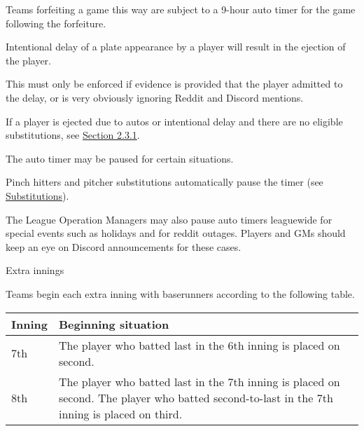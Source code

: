 \begin{deepEnumerate}
\begin{deepEnumerate}
\begin{deepEnumerate}
			\begin{deepEnumerate}
				\item Teams forfeiting a game this way are subject to a 9-hour auto timer for the game following the forfeiture.
			\end{deepEnumerate}
			\item Intentional delay of a plate appearance by a player will result in the ejection of the player.
			\begin{deepEnumerate}
				\item This must only be enforced if evidence is provided that the player admitted to the delay, or is very obviously ignoring Reddit and Discord mentions.
			\end{deepEnumerate}
		\end{deepEnumerate}
		\item If a player is ejected due to autos or intentional delay and there are no eligible substitutions, see \hyperref[sec:lineups]{Section 2.3.1}.
		\item The auto timer may be paused for certain situations.
		\begin{deepEnumerate}
			\item Pinch hitters and pitcher substitutions automatically pause the timer (see \hyperref[sec:substitutions]{Substitutions}).
			\item The League Operation Managers may also pause auto timers leaguewide for special events such as holidays and for reddit outages.
			Players and GMs should keep an eye on Discord announcements for these cases.
		\end{deepEnumerate}
	\end{deepEnumerate}
	\item Extra innings
	\label{sec:extra innings}
	\begin{deepEnumerate}
		\item Teams begin each extra inning with baserunners according to the following table.
		\begin{center}										                
			\begin{longtable}{|p{3cm}|p{8cm}|}
				\hline
				\textbf{Inning} & \textbf{Beginning situation}                                          \\
				\hline
				7th             & The player who batted last in the 6th inning is placed on second.     \\
				\hline
				8th             & The player who batted last in the 7th inning is placed on second.     
				The player who batted second-to-last in the 7th inning is placed on third. \\

\end{longtable}
\end{center}
\end{deepEnumerate}
\end{deepEnumerate}
